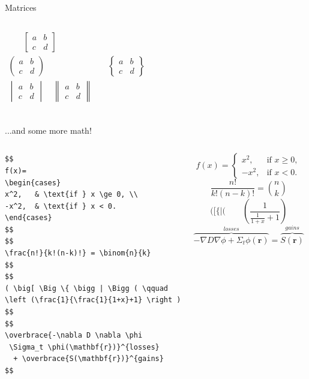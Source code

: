 \documentclass[aspectratio=1610]{beamer}
\begin{document}
\begin{frame}[fragile]{Matrices}
\begin{columns}[T]
\begin{align*}
\begin{matrix}
   \end{matrix} \quad
 \begin{bmatrix} a & b \\ c & d
   \end{bmatrix} & \\
 \begin{pmatrix} a & b \\ c & d
   \end{pmatrix} & \quad
 \begin{Bmatrix} a & b \\ c & d
   \end{Bmatrix} \\
 \begin{vmatrix} a & b \\ c & d
   \end{vmatrix} \quad
 \begin{Vmatrix} a & b \\ c & d
   \end{Vmatrix} & \\
\end{align*}
  \end{columns}
\end{frame}

\begin{frame}[fragile]{...and some more math!}
  \begin{columns}[T]
      \begin{lstlisting}
$$
f(x)=
\begin{cases}
x^2,   & \text{if } x \ge 0, \\
-x^2,  & \text{if } x < 0.
\end{cases}
$$
$$
\frac{n!}{k!(n-k)!} = \binom{n}{k}
$$
$$
( \big[ \Big \{ \bigg | \Bigg ( \qquad
\left (\frac{1}{\frac{1}{1+x}+1} \right )
$$
$$
\overbrace{-\nabla D \nabla \phi
 \Sigma_t \phi(\mathbf{r})}^{losses}
  + \overbrace{S(\mathbf{r})}^{gains}
$$
      \end{lstlisting}
$$
f(x)=
\begin{cases}
x^2,   & \text{if } x \ge 0, \\
-x^2,  & \text{if } x < 0.
\end{cases}
$$
$$
\frac{n!}{k!(n-k)!} = \binom{n}{k}
$$
$$
( \big[ \Big \{ \bigg | \Bigg ( \qquad
\left (\frac{1}{\frac{1}{1+x}+1} \right )
$$
$$
\overbrace{-\nabla D \nabla \phi +
 \Sigma_t \phi(\mathbf{r})}^{losses}
  = \overbrace{S(\mathbf{r})}^{gains}
$$
  \end{columns}
\end{frame}
\end{document}
